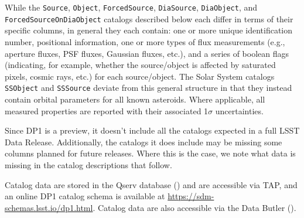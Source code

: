 While the \texttt{Source}, \texttt{Object}, \texttt{ForcedSource}, \texttt{DiaSource}, \texttt{DiaObject}, and \texttt{ForcedSourceOnDiaObject} catalogs described below each differ in terms of their specific columns, in general they each contain: one or more unique identification number, positional information, one or more types of \gls{flux} measurements (e.g., aperture fluxes, \gls{PSF} fluxes, Gaussian fluxes, etc.), and a series of boolean flags (indicating, for example, whether the source/object is affected by saturated pixels, cosmic rays, etc.) for each source/object.
The Solar System catalogs \texttt{SSObject} and \texttt{SSSource} deviate from this general structure in that they instead contain orbital parameters for all known asteroids.
Where applicable, all measured properties are reported with their associated 1$\sigma$ uncertainties.

Since \gls{DP1} is a preview, it doesn't include all the catalogs expected in a full \gls{LSST} \gls{Data Release}. Additionally, the catalogs it does include may be missing some columns planned for future releases.
Where this is the case, we note what data is missing in the catalog descriptions that follow.

Catalog data are stored in the \gls{Qserv} database () and are accessible via \gls{TAP}, and an online \gls{DP1} catalog \gls{schema} is available at \url{https://sdm-schemas.lsst.io/dp1.html}.
Catalog data are also accessible via the Data \gls{Butler} ().

